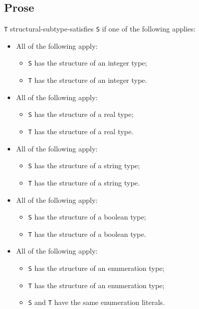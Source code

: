 \documentclass{book}
\begin{document}
\subsection{Prose}
  \texttt{T} structural-subtype-satisfies \texttt{S} if one of the following applies:
  \begin{itemize}
  \item All of the following apply:
    \begin{itemize}
    \item \texttt{S} has the structure of an integer type;
    \item \texttt{T} has the structure of an integer type.
    \end{itemize}

  \item All of the following apply:
    \begin{itemize}
    \item \texttt{S} has the structure of a real type;
    \item \texttt{T} has the structure of a real type.
    \end{itemize} 

  \item All of the following apply:
    \begin{itemize}
    \item \texttt{S} has the structure of a string type;
    \item \texttt{T} has the structure of a string type.
    \end{itemize}

  \item All of the following apply:
    \begin{itemize}
    \item \texttt{S} has the structure of a boolean type;
    \item \texttt{T} has the structure of a boolean type.
    \end{itemize}

  \item All of the following apply:
    \begin{itemize}
    \item \texttt{S} has the structure of an enumeration type; 
    \item \texttt{T} has the structure of an enumeration type;
    \item \texttt{S} and \texttt{T} have the same enumeration literals.
    \end{itemize}


\end{itemize}
\end{document}
